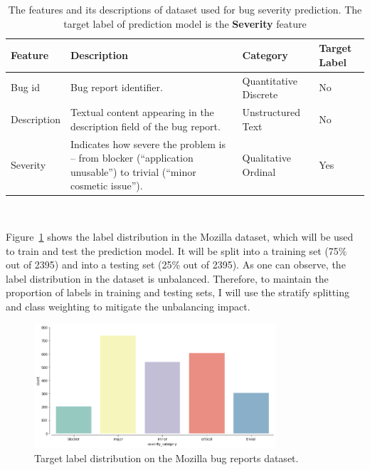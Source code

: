 \documentclass[a4paper]{article}
\begin{document}
\begin{table}[ht!]
    \centering
    \begin{tabular}{@{}p{}p{}p{}p{}@{}}
    \toprule
    {\bf Feature} & {\bf Description} & {\bf Category} & {\bf Target Label}\\
    \midrule
    Bug id                       & Bug report identifier.  & Quantitative Discrete & No\\
    \midrule
    Description                  & Textual content appearing in the description field of the bug report.                                                                               & Unstructured Text & No\\
    \midrule
    Severity                     & Indicates how severe the problem is – from blocker (``application unusable”) to trivial (``minor cosmetic issue”).                                & Qualitative Ordinal & Yes\\
    \bottomrule 
    \end{tabular}
    \caption{The features and its descriptions of dataset used for bug severity prediction. The target label of prediction model is the {\bf Severity} feature }\\
    \label{tab:features_descriptions}
\end{table}

\bigskip
Figure~\ref{fig:severity_class_distribution} shows the label distribution in the Mozilla dataset, which will be used to train and test the prediction model. It will be split into a training set (75\% out of 2395) and into a testing set (25\% out of 2395). As one can observe, the label distribution in the dataset is unbalanced. Therefore, to maintain the proportion of labels in training and testing sets, I will use the stratify splitting and class weighting\cite{procrastinator:2021} to mitigate the unbalancing impact.

\begin{figure}[ht!]
    \centering
    \includegraphics[width=0.8\textwidth]{figures/severity-labels-distribution.png}
    \caption{Target label distribution on the Mozilla bug reports dataset.}
    \label{fig:severity_class_distribution}
\end{figure}
\end{document}
